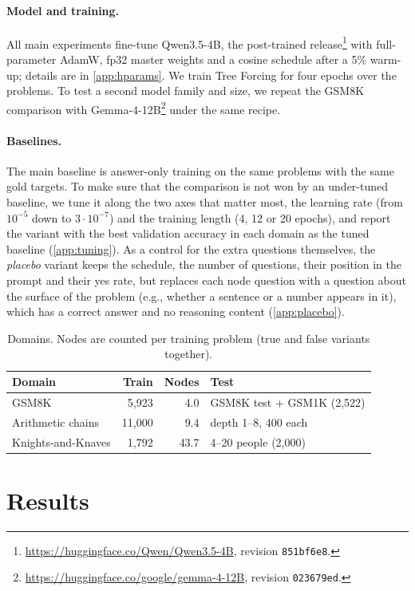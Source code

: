 \documentclass{article}
\newcommand{\tf}{Tree Forcing}
\begin{document}
\paragraph{Model and training.} All main experiments fine-tune Qwen3.5-4B, the post-trained release\footnote{\url{https://huggingface.co/Qwen/Qwen3.5-4B}, revision
\texttt{851bf6e8}.} with full-parameter AdamW, fp32 master weights and a cosine schedule after
a 5\% warm-up; details are in \cref{app:hparams}. We train \tf{} for four epochs over the problems. To test a second
model family and size, we repeat the GSM8K comparison with Gemma-4-12B\footnote{\url{https://huggingface.co/google/gemma-4-12B},
revision \texttt{023679ed}.} under the same recipe.

\paragraph{Baselines.} The main baseline is answer-only training on the same problems with the same gold targets. To
make sure that the comparison is not won by an under-tuned baseline, we tune it along the two axes that matter most,
the learning rate (from $10^{-5}$ down to $3\cdot10^{-7}$) and the training length (4, 12 or 20 epochs), and report
the variant with the best validation accuracy in each domain as the tuned baseline (\cref{app:tuning}). As a control for the extra questions themselves, the \emph{placebo} variant keeps the schedule, the number
of questions, their position in the prompt and their yes rate, but replaces each node question with a question about
the surface of the problem (e.g., whether a sentence or a number appears in it), which has a correct answer and no
reasoning content (\cref{app:placebo}).

\begin{table}[t]
\centering
\small
\caption{Domains. Nodes are counted per training problem (true and false variants together).}
\label{tab:data}
\begin{tabular}{lrrl}
\toprule
Domain & Train & Nodes & Test \\
\midrule
GSM8K & 5,923 & 4.0 & GSM8K test + GSM1K (2,522) \\
Arithmetic chains & 11,000 & 9.4 & depth 1--8, 400 each \\
Knights-and-Knaves & 1,792 & 43.7 & 4--20 people (2,000) \\
\bottomrule
\end{tabular}
\end{table}

\section{Results}
\label{sec:results}
\end{document}
